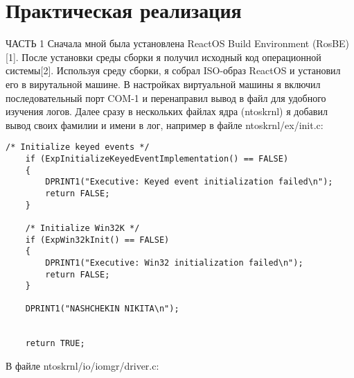 \documentclass[a4paper, 14pt]{extarticle}
\begin{document}
\section{Практическая реализация}
\begin{flushleft}
ЧАСТЬ 1 \newline
Сначала мной была установлена ReactOS Build Environment (RosBE)[1]. После установки среды сборки я получил исходный код операционной системы[2]. Используя среду сборки, я собрал ISO-образ ReactOS и установил его в вирутальной машине. В настройках виртуальной машины я включил последовательный порт COM-1 и перенаправил вывод в файл для удобного изучения логов. \newline
Далее сразу в нескольких файлах ядра (ntoskrnl) я добавил вывод своих фамилии и имени в лог, например в файле ntoskrnl/ex/init.c:
\end{flushleft}
\begin{verbatim}
/* Initialize keyed events */
    if (ExpInitializeKeyedEventImplementation() == FALSE)
    {
        DPRINT1("Executive: Keyed event initialization failed\n");
        return FALSE;
    }

    /* Initialize Win32K */
    if (ExpWin32kInit() == FALSE)
    {
        DPRINT1("Executive: Win32 initialization failed\n");
        return FALSE;
    }
    
    DPRINT1("NASHCHEKIN NIKITA\n");
    
    
    return TRUE;
\end{verbatim}

\begin{flushleft}
В файле ntoskrnl/io/iomgr/driver.c:
\end{flushleft}
\end{document}

